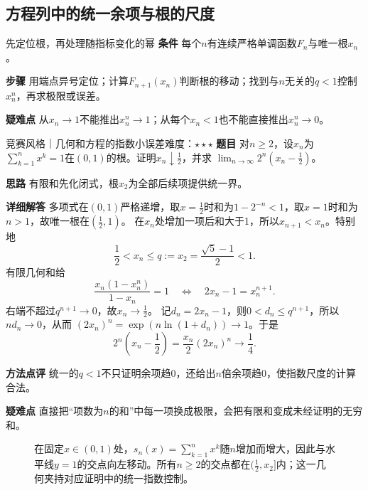 \subsection{方程列中的统一余项与根的尺度}\label{cs:roots}
\begin{method}{先定位根，再处理随指标变化的幂}
\textbf{条件} 每个$n$有连续严格单调函数$F_n$与唯一根$x_n$。
\par\textbf{步骤} 用端点异号定位；计算$F_{n+1}(x_n)$判断根的移动；找到与$n$无关的$q<1$控制$x_n^n$，再求极限或误差。
\par\textbf{疑难点} 从$x_n\to1$不能推出$x_n^n\to1$；从每个$x_n<1$也不能直接推出$x_n^n\to0$。
\end{method}
\begin{example}{竞赛风格｜几何和方程的指数小误差}{难度：$\star\star\star$}\label{cs:ex:geometricroot}
\textbf{题目} 对$n\ge2$，设$x_n$为$\sum_{k=1}^{n}x^k=1$在$(0,1)$的根。证明$x_n\downarrow\frac{1}{2}$，并求
$\lim_{n\to\infty}2^n(x_n-\frac{1}{2})$。
\par\textbf{思路} 有限和先化闭式，根$x_2$为全部后续项提供统一界。
\par\textbf{详细解答} 多项式在$(0,1)$严格递增，取$x=\frac{1}{2}$时和为$1-2^{-n}<1$，取$x=1$时和为$n>1$，故唯一根在$(\frac{1}{2},1)$。
在$x_n$处增加一项后和大于1，所以$x_{n+1}<x_n$。特别地
\[
\dfrac12<x_n\le q:=x_2=\dfrac{\sqrt5-1}{2}<1.
\]
有限几何和给
\[
\dfrac{x_n(1-x_n^n)}{1-x_n}=1
\quad\Longleftrightarrow\quad 2x_n-1=x_n^{n+1}.
\]
右端不超过$q^{n+1}\to0$，故$x_n\to\frac{1}{2}$。
记$d_n=2x_n-1$，则$0<d_n\le q^{n+1}$，所以$nd_n\to0$，从而
$(2x_n)^n=\exp(n\ln(1+d_n))\to1$。于是
\[
2^n(x_n-\dfrac12)
=\dfrac{x_n}{2}(2x_n)^n\longrightarrow\dfrac14.
\]
\par\textbf{方法点评} 统一的$q<1$不只证明余项趋0，还给出$n$倍余项趋0，使指数尺度的计算合法。
\par\textbf{疑难点} 直接把“项数为$n$的和”中每一项换成极限，会把有限和变成未经证明的无穷和。
\end{example}
\begin{figure}[htbp]\centering
{}
\caption{在固定$x\in(0,1)$处，$s_n(x)=\sum_{k=1}^nx^k$随$n$增加而增大，因此与水平线$y=1$的交点向左移动。所有$n\ge2$的交点都在$(\frac{1}{2},x_2]$内；这一几何夹持对应证明中的统一指数控制。}\label{cs:fig:rootfamily}
\end{figure}
